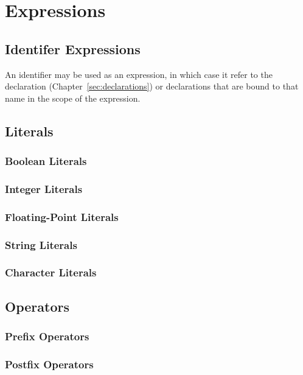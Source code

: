 \chapter{Expressions}

\section{Identifer Expressions}

An identifier may be used as an expression, in which case it refer to the declaration (Chapter~\ref{sec:declarations}) or declarations that are bound to that name in the scope of the expression.

\section{Literals}

\subsection{Boolean Literals}

\subsection{Integer Literals}

\subsection{Floating-Point Literals}

\subsection{String Literals}

\subsection{Character Literals}

\section{Operators}

\subsection{Prefix Operators}

\subsection{Postfix Operators}

